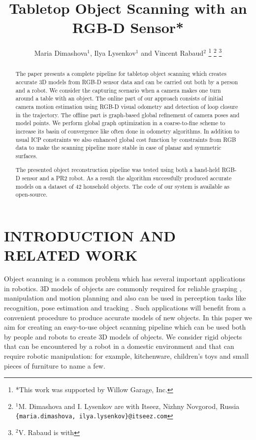\documentclass[letterpaper, 10 pt, conference]{ieeeconf}  %
\title{\LARGE \bf
Tabletop Object Scanning with an RGB-D Sensor*
}
\author{Maria Dimashova$^{1}$, Ilya Lysenkov$^{1}$ and  Vincent Rabaud$^{2}$
\thanks{*This work was supported by Willow Garage, Inc.}%
\thanks{$^{1}$M. Dimashova and I. Lysenkov are with Itseez, Nizhny Novgorod, Russia
        {\tt\small \{maria.dimashova, ilya.lysenkov\}@itseez.com}}%
\thanks{$^{2}$V. Rabaud is with {\tt\small }}%
}
\begin{document}
\maketitle
\thispagestyle{empty}
\pagestyle{empty}


\begin{abstract}
The paper presents a complete pipeline for tabletop object scanning
which creates accurate 3D models from RGB-D sensor data and can be carried out both by a person
and a robot. We consider the capturing scenario when a camera makes
one turn around a table with an object. The online part of our approach consists 
of initial camera motion estimation using RGB-D visual
odometry and detection of loop closure in the trajectory. The offline part
is graph-based global refinement of camera poses and model points.
We perform global graph optimization in a coarse-to-fine scheme to 
increase its basin of convergence like often done in odometry algorithms. 
In addition to usual ICP constraints we also enhanced global cost function 
by constraints from RGB data to make the scanning pipeline more stable in case 
of planar and symmetric surfaces. 

The presented object reconstruction pipeline was tested using both a hand-held RGB-D sensor and a PR2 robot.
As a result the algorithm successfully produced accurate models on a dataset of 42 household objects.
The code of our system is available as open-source.

\end{abstract}


\section{INTRODUCTION AND RELATED WORK}

Object scanning is a common problem which has several important applications in robotics.
3D models of objects are commonly required for reliable grasping \cite{miller2004graspit, sahbani2012overview},
manipulation and motion planning and also can be used in perception tasks like recognition, pose estimation and tracking \cite{klank2009real, hinterstoisser2012accv}.
Such applications will benefit from a convenient procedure
to produce accurate models of new objects.
In this paper we aim for creating an easy-to-use object scanning pipeline
which can be used both by people and robots to create 3D models of objects.
We consider rigid objects that can be encountered
by a robot in a domestic environment and that can require robotic manipulation:
for example, kitchenware, children's toys and small pieces of furniture to name a few.
\end{document}
